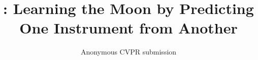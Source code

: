 \documentclass[10pt,twocolumn,letterpaper]{article}
\title{\method: Learning the Moon by Predicting One Instrument from Another}
\author{Anonymous CVPR submission}
\begin{document}
\maketitle
    





{
    \small
    
    
}


\end{document}
